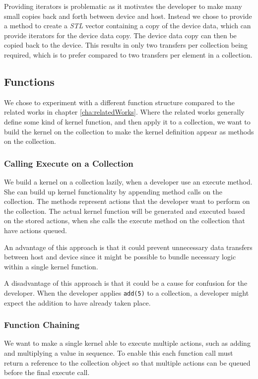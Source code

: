 Providing iterators is problematic as it motivates the developer to make many small copies back and forth between device and host. Instead we chose to provide a method to create a \textit{STL} vector containing a copy of the device data, which can provide iterators for the device data copy. The device data copy can then be copied back to the device. This results in only two transfers per collection being required, which is to prefer compared to two transfers per element in a collection.

\subsection{Functions}
We chose to experiment with a different function structure compared to the related works in chapter \ref{cha:relatedWorks}. Where the related works generally define some kind of kernel function, and then apply it to a collection, we want to build the kernel on the collection to make the kernel definition appear as methods on the collection.

\subsubsection{Calling Execute on a Collection}
We build a kernel on a collection lazily, when a developer use an execute method. She can build up kernel functionality by appending method calls on the collection. The methods represent actions that the developer want to perform on the collection. The actual kernel function will be generated and executed based on the stored actions, when she calls the execute method on the collection that have actions queued.

An advantage of this approach is that it could prevent unnecessary data transfers between host and device since it might be possible to bundle necessary logic within a single kernel function. 

A disadvantage of this approach is that it could be a cause for confusion for the developer. When the developer applies \texttt{add(5)} to a collection, a developer might expect the addition to have already taken place.

\subsubsection{Function Chaining}
We want to make a single kernel able to execute multiple actions, such as adding and multiplying a value in sequence. To enable this each function call must return a reference to the collection object so that multiple actions can be queued before the final execute call.

